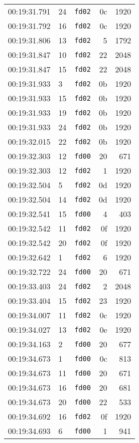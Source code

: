 \documentclass{article}
\begin{document}
\begin{longtable}{lllrr}
00:19:31.791 & 24 & \texttt{fd02} & 0c & 1920 \\
00:19:31.792 & 16 & \texttt{fd02} & 0c & 1920 \\
00:19:31.806 & 13 & \texttt{fd02} & 5 & 1792 \\
00:19:31.847 & 10 & \texttt{fd02} & 22 & 2048 \\
00:19:31.847 & 15 & \texttt{fd02} & 22 & 2048 \\
00:19:31.933 & 3 & \texttt{fd02} & 0b & 1920 \\
00:19:31.933 & 15 & \texttt{fd02} & 0b & 1920 \\
00:19:31.933 & 19 & \texttt{fd02} & 0b & 1920 \\
00:19:31.933 & 24 & \texttt{fd02} & 0b & 1920 \\
00:19:32.015 & 22 & \texttt{fd02} & 0b & 1920 \\
00:19:32.303 & 12 & \texttt{fd00} & 20 & 671 \\
00:19:32.303 & 12 & \texttt{fd02} & 1 & 1920 \\
00:19:32.504 & 5 & \texttt{fd02} & 0d & 1920 \\
00:19:32.504 & 14 & \texttt{fd02} & 0d & 1920 \\
00:19:32.541 & 15 & \texttt{fd00} & 4 & 403 \\
00:19:32.542 & 11 & \texttt{fd02} & 0f & 1920 \\
00:19:32.542 & 20 & \texttt{fd02} & 0f & 1920 \\
00:19:32.642 & 1 & \texttt{fd02} & 6 & 1920 \\
00:19:32.722 & 24 & \texttt{fd00} & 20 & 671 \\
00:19:33.403 & 24 & \texttt{fd02} & 2 & 2048 \\
00:19:33.404 & 15 & \texttt{fd02} & 23 & 1920 \\
00:19:34.007 & 11 & \texttt{fd02} & 0c & 1920 \\
00:19:34.027 & 13 & \texttt{fd02} & 0e & 1920 \\
00:19:34.163 & 2 & \texttt{fd00} & 20 & 677 \\
00:19:34.673 & 1 & \texttt{fd00} & 0c & 813 \\
00:19:34.673 & 11 & \texttt{fd00} & 20 & 671 \\
00:19:34.673 & 16 & \texttt{fd00} & 20 & 681 \\
00:19:34.673 & 20 & \texttt{fd00} & 22 & 533 \\
00:19:34.692 & 16 & \texttt{fd02} & 0f & 1920 \\
00:19:34.693 & 6 & \texttt{fd00} & 1 & 941 \\

\end{longtable}
\end{document}
